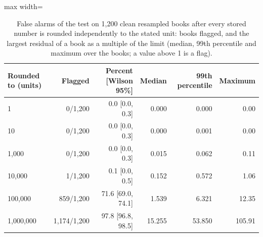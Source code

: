 \begin{table}[htbp]
\centering
\small
\caption{False alarms of the test on 1,200 clean resampled books after every stored number is rounded independently to the stated unit: books flagged, and the largest residual of a book as a multiple of the limit (median, 99th percentile and maximum over the books; a value above 1 is a flag).}
\label{tab:rounding}
\begin{adjustbox}{max width=\textwidth}
\begin{tabular}{lrrrrr}
\toprule
Rounded to (units) & Flagged & Percent [Wilson 95\%] & Median & 99th percentile & Maximum \\
\midrule
1 & 0/1,200 & 0.0 [0.0, 0.3] & 0.000 & 0.000 & 0.00 \\
10 & 0/1,200 & 0.0 [0.0, 0.3] & 0.000 & 0.001 & 0.00 \\
1,000 & 0/1,200 & 0.0 [0.0, 0.3] & 0.015 & 0.062 & 0.11 \\
10,000 & 1/1,200 & 0.1 [0.0, 0.5] & 0.152 & 0.572 & 1.06 \\
100,000 & 859/1,200 & 71.6 [69.0, 74.1] & 1.539 & 6.321 & 12.35 \\
1,000,000 & 1,174/1,200 & 97.8 [96.8, 98.5] & 15.255 & 53.850 & 105.91 \\
\bottomrule
\end{tabular}
\end{adjustbox}
\end{table}
